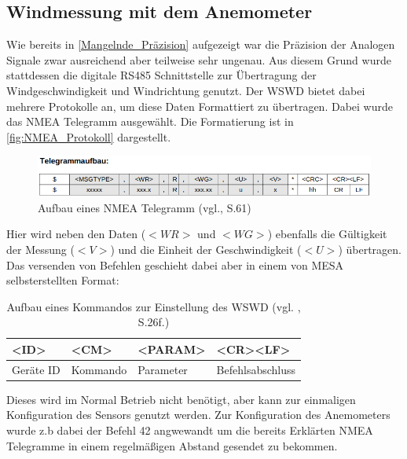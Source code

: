 \subsection{Windmessung mit dem Anemometer}
Wie bereits in \autoref{Mangelnde_Präzision} aufgezeigt war die Präzision der Analogen Signale zwar ausreichend aber teilweise sehr ungenau. Aus diesem Grund wurde stattdessen die digitale RS485 Schnittstelle zur Übertragung der Windgeschwindigkeit und Windrichtung genutzt. Der WSWD bietet dabei mehrere Protokolle an, um diese Daten Formattiert zu übertragen. Dabei wurde das \ac{NMEA} Telegramm ausgewählt. Die Formatierung ist in \autoref{fig:NMEA_Protokoll} dargestellt.
\begin{figure}[H]
	\centering
	\includegraphics[width=\linewidth]{images/Software/NMEA_Telegramm_Aufbau.png}
	\caption{Aufbau eines NMEA Telegramm (vgl.\cite{WSWD}, S.61)}
	\label{fig:NMEA_Protokoll}
\end{figure}
\noindent Hier wird neben den Daten ($<WR>$ und $<WG>$) ebenfalls die Gültigkeit der Messung ($<V>$) und die Einheit der Geschwindigkeit ($<U>$) übertragen. Das versenden von Befehlen geschieht dabei aber in einem von MESA selbsterstellten Format:
\begin{table}[H]
	\centering
	\begin{tabular}{|l|l|l|l|}
		\hline
		\textbf{\textless{}ID\textgreater{}} & \textbf{\textless{}CM\textgreater{}} & \textbf{\textless{}PARAM\textgreater{}} & \textbf{\textless{}CR\textgreater{}\textless{}LF\textgreater{}} \\ \hline
		Geräte ID                            & Kommando                             & Parameter                               & Befehlsabschluss                                                \\ \hline
	\end{tabular}
	\caption{Aufbau eines Kommandos zur Einstellung des WSWD (vgl. \cite{WSWD}, S.26f.)}
	\label{tab:my-table}
\end{table}
\noindent Dieses wird im Normal Betrieb nicht benötigt, aber kann zur einmaligen Konfiguration des Sensors genutzt werden. Zur Konfiguration des Anemometers wurde z.b dabei der Befehl 42 angwewandt um die bereits Erklärten \ac{NMEA} Telegramme in einem regelmäßigen Abstand gesendet zu bekommen.

